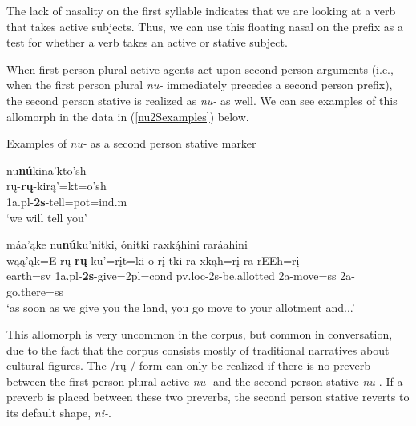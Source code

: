 The lack of nasality on the first syllable indicates that we are looking at a verb that takes active subjects. Thus, we can use this floating nasal on the prefix as a test for whether a verb takes an active or stative subject.

\label{nu2S}

When first person plural active agents act upon second person arguments (i.e., when the first person plural \textit{nu-} immediately precedes a second person prefix), the second person stative is realized as \textit{nu-} as well. We can see examples of this allomorph in the data in (\ref{nu2Sexamples}) below.

\begin{exe}

\item\label{nu2Sexamples} Examples of \textit{nu-} as a second person stative marker

	\begin{xlist}
	
	\item \glll nu\textbf{nú}kina'kto'sh\\
	rų-\textbf{rų}-kirą'=kt=o'sh\\
	1a.pl-\textbf{2s}-\textnormal{tell}=pot=ind.m\\
	\glt `we will tell you' \citep[10]{kennard1936}
	
	\item \glll máa'ąke nu\textbf{nú}ku'nitki, ónitki raxką́hini raráahini\\
	wąą'ąk=E rų-\textbf{rų}-ku'=rįt=ki o-rį-tki ra-xkąh=rį ra-rEEh=rį\\
	\textnormal{earth}=sv 1a.pl-\textbf{2s}-\textnormal{give}=2pl=cond pv.loc-2s-\textnormal{be.allotted} 2a-\textnormal{move}=ss 2a-\textnormal{go.there}=ss\\
	\glt `as soon as we give you the land, you go move to your allotment and...' \citep[217]{trechter2012b}
	
	\end{xlist}

\end{exe}

This allomorph is very uncommon in the corpus, but common in conversation, due to the fact that the corpus consists mostly of traditional narratives about cultural figures. The /rų-/ form can only be realized if there is no preverb between the first person plural active \textit{nu-} and the second person stative \textit{nu-}. If a preverb is placed between these two preverbs, the second person stative reverts to its default shape, \textit{ni-}.

